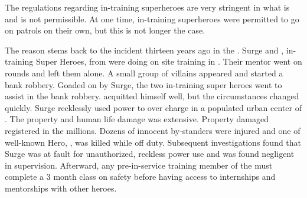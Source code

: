 \documentclass[blue]{LRSguildcamp1}
\begin{document}
\name{\bChicagoIncident{}}

The regulations regarding in-training superheroes are very stringent in what is and is not permissible. At one time, in-training superheroes were permitted to go on patrols on their own, but this is not longer the case. 

The reason stems back to the incident thirteen years ago in the \pCityO{}. Surge and \cJuggernaut{}, in-training Super Heroes, from \pSuperSchool{} were doing on site training in \pCityO{}. Their mentor \cOS{\MYsupername} went on rounds and left them alone. A small group of villains appeared and started a bank robbery. Goaded on by Surge, the two in-training super heroes went to assist in the bank robbery. \cJuggernaut{} acquitted himself well, but the circumstances changed quickly. Surge recklessly used \cYS{\their} power to over charge \cJuggernaut{} in a populated urban center of \pCityO{}. The property and human life damage was extensive. Property damaged registered in the millions. Dozens of innocent by-standers were injured and one of well-known Hero, \cAS{}, was killed while off duty. Subsequent investigations found that Surge was at fault for unauthorized, reckless power use and \cOS{\MYsupername} was found negligent in supervision. 
Afterward, any pre-in-service training member of the \cHeroLeague{\intro} must complete a 3 month class on safety before having access to internships and mentorships with other heroes. 


\end{document}
